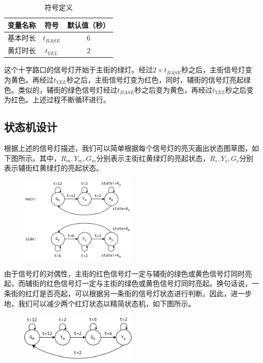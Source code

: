 \documentclass{ctexart}
\begin{document}
\begin{table}[H]
    \centering
    \caption{符号定义}
    \begin{tabular}{ c c c }
        \hline
        变量名称 & 符号 & 默认值（秒）\\
        \hline
        基本时长 & $t_{BASE}$ & 6 \\
        黄灯时长 & $t_{YEL}$ & 2 \\
        \hline
    \end{tabular}
\end{table}

这个十字路口的信号灯开始于主街的绿灯。经过$2 \times t_{BASE}$秒之后，主街信号灯变为黄色。再经过$t_{YEL}$秒之后，主街信号灯变为红色，同时，辅街的信号灯亮起绿色。类似的，辅街的绿色信号灯经过$t_{BASE}$秒之后变为黄色，再经过$t_{YEL}$秒之后变为红色。上述过程不断循环进行。

\subsection{状态机设计}

根据上述的信号灯描述，我们可以简单根据每个信号灯的亮灭画出状态图草图，如下图所示。其中，$R_m, Y_m, G_m$分别表示主街红黄绿灯的亮起状态，$R_s, Y_s, G_s$分别表示辅街红黄绿灯的亮起状态。

\begin{figure}[H]
    \centering
    \includegraphics[width=0.5\textwidth]{lab2/10.png}
\end{figure}

由于信号灯的对偶性，主街的红色信号灯一定与辅街的绿色或黄色信号灯同时亮起，而辅街的红色信号灯一定与主街的绿色或黄色信号灯同时亮起。换句话说，一条街的红灯是否亮起，可以根据另一条街的信号灯状态进行判断。因此，进一步地，我们可以减少两个红灯状态以精简状态机，如下图所示。

\begin{figure}[H]
    \centering
    \includegraphics[width=0.5\textwidth]{lab2/11.png}
\end{figure}
\end{document}
